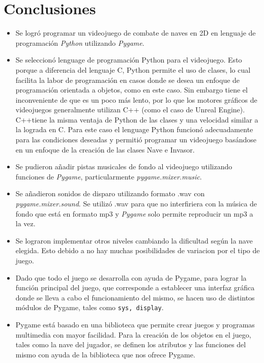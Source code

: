 \documentclass[12pt,letterpaper]{article}
\begin{document}
\section{Conclusiones}
\begin{itemize}
    \item Se logró programar un videojuego de combate de naves en 2D en lenguaje de programación \textit{Python} utilizando  \textit{Pygame}.
    \item Se seleccionó lenguage de programación Python para el videojuego. Esto porque a diferencia del lenguaje C, Python permite el uso de clases, lo cual facilita la labor de programación en casos donde se desea un enfoque de programación orientada a objetos, como en este caso. Sin embargo tiene el inconveniente de que es un poco más lento, por lo que los motores gráficos de videojuegos generalmente utilizan C++ (como el caso de Unreal Engine). C++tiene  la misma ventaja de Python de las clases y una velocidad similar a la lograda en C. Para este caso el lenguage Python funcionó adecuadamente para las condiciones deseadas y permitió programar un videojuego basándose en un enfoque de la creación de las clases Nave e Invasor. 
    \item Se pudieron añadir pistas musicales de fondo al videojuego utilizando funciones de \textit{Pygame}, particularmente \textit{pygame.mixer.music}.
    
     \item Se añadieron sonidos de disparo utilizando formato .wav con \textit{pygame.mixer.sound}. Se utilizó .wav para que no interfiriera con la música de fondo que está en formato mp3 y \textit{Pygame} solo permite reproducir un mp3 a la vez.
     
    \item Se lograron implementar otros niveles cambiando la dificultad según la nave elegida. Esto debido a no hay muchas posibilidades de variacion por el tipo de juego. 
    
    \item Dado que todo el juego se desarrolla con ayuda de Pygame, para lograr la función principal del juego, que corresponde a establecer una interfaz gráfica donde se lleva a cabo el funcionamiento del mismo, se hacen uso de distintos módulos de Pygame, tales como \texttt{sys, display}.
    
    \item Pygame está basado en una biblioteca que permite crear juegos y programas multimedia con mayor facilidad. Para la creación de los objetos en el juego, tales como la nave del jugador, se definen los atributos y las funciones del mismo con ayuda de la biblioteca que nos ofrece Pygame.
    

\end{itemize}
\end{document}
